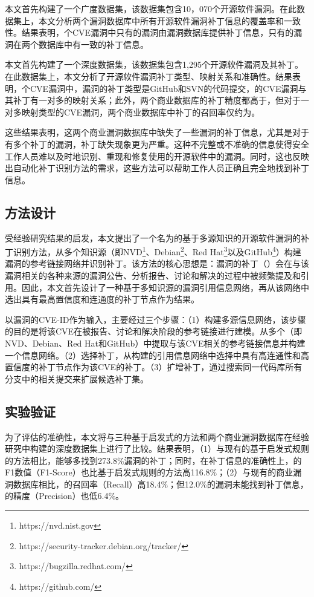 本文首先构建了一个广度数据集，该数据集包含10，070个开源软件漏洞。在此数据集上，本文分析两个漏洞数据库中所有开源软件漏洞补丁信息的覆盖率和一致性。结果表明，个CVE漏洞中只有的漏洞由漏洞数据库提供补丁信息，只有的漏洞在两个数据库中有一致的补丁信息。%

本文首先构建了一个深度数据集，该数据集包含1,295个开源软件漏洞及其补丁。在此数据集上，本文分析了开源软件漏洞补丁类型、映射关系和准确性。结果表明，个CVE漏洞中，漏洞的补丁类型是GitHub和SVN的代码提交，的CVE漏洞与其补丁有一对多的映射关系；此外，两个商业数据库的补丁精度都高于，但对于一对多映射类型的CVE漏洞，两个商业数据库中补丁的召回率仅约为。

这些结果表明，这两个商业漏洞数据库中缺失了一些漏洞的补丁信息，尤其是对于有多个补丁的漏洞，补丁缺失现象更为严重。这种不完整或不准确的信息使得安全工作人员难以及时地识别、重现和修复使用的开源软件中的漏洞。同时，这也反映出自动化补丁识别方法的需求，这些方法可以帮助工作人员正确且完全地找到补丁信息。

\subsection{方法设计}
受经验研究结果的启发，本文提出了一个名为\tool 的基于多源知识的开源软件漏洞的补丁识别方法，从多个知识源（即NVD\footnote{https://nvd.nist.gov}、Debian\footnote{https://security-tracker.debian.org/tracker/}、Red Hat\footnote{https://bugzilla.redhat.com/}以及GitHub\footnote{https://github.com/}）构建漏洞的参考链接网络并识别补丁。该方法的核心思想是：漏洞的补丁（）会在与该漏洞相关的各种来源的漏洞公告、分析报告、讨论和解决的过程中被频繁提及和引用。因此，本文首先设计了一种基于多知识源的漏洞引用信息网络，再从该网络中选出具有最高置信度和连通度的补丁节点作为结果。

\tool 以漏洞的CVE-ID作为输入，主要经过三个步骤：（1）构建多源信息网络，该步骤的目的是将该CVE在被报告、讨论和解决阶段的参考链接进行建模。\tool 从多个（即NVD、Debian、Red Hat和GitHub）中提取与该CVE相关的参考链接信息并构建一个信息网络。（2）选择补丁，\tool 从构建的引用信息网络中选择中具有高连通性和高置信度的补丁节点作为该CVE的补丁。（3）扩增补丁，\tool 通过搜索同一代码库所有分支中的相关提交来扩展候选补丁集。

\subsection{实验验证}
为了评估\tool 的准确性，本文将\tool 与三种基于启发式的方法和两个商业漏洞数据库在经验研究中构建的深度数据集上进行了比较。结果表明，（1）与现有的基于启发式规则的方法相比，\tool 能够多找到273.8\%漏洞的补丁；同时，在补丁信息的准确性上，\tool 的F1数值（F1-Score）也比基于启发式规则的方法高116.8\%；（2）与现有的商业漏洞数据库相比，\tool 的召回率（Recall）高18.4\%；但12.0\%的漏洞\tool 未能找到补丁信息，\tool 的精度（Precision）也低6.4\%。%


